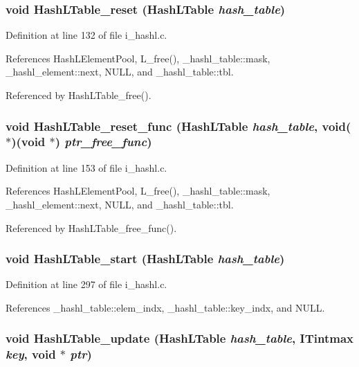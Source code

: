 \subsubsection{\setlength{\rightskip}{0pt plus 5cm}void Hash\-LTable\_\-reset (\bf{Hash\-LTable} {\em hash\_\-table})}\label{i__hashl_8h_aaa44d3f5471ec352c95a534f5a46ebc}




Definition at line 132 of file i\_\-hashl.c.

References Hash\-LElement\-Pool, L\_\-free(), \_\-hashl\_\-table::mask, \_\-hashl\_\-element::next, NULL, and \_\-hashl\_\-table::tbl.

Referenced by Hash\-LTable\_\-free().
\subsubsection{\setlength{\rightskip}{0pt plus 5cm}void Hash\-LTable\_\-reset\_\-func (\bf{Hash\-LTable} {\em hash\_\-table}, void($\ast$)(void $\ast$) {\em ptr\_\-free\_\-func})}\label{i__hashl_8h_7be7973671be7e3ae2e03faaca4fad72}




Definition at line 153 of file i\_\-hashl.c.

References Hash\-LElement\-Pool, L\_\-free(), \_\-hashl\_\-table::mask, \_\-hashl\_\-element::next, NULL, and \_\-hashl\_\-table::tbl.

Referenced by Hash\-LTable\_\-free\_\-func().
\subsubsection{\setlength{\rightskip}{0pt plus 5cm}void Hash\-LTable\_\-start (\bf{Hash\-LTable} {\em hash\_\-table})}\label{i__hashl_8h_5315f1b571d35c6c9a785026de68f323}




Definition at line 297 of file i\_\-hashl.c.

References \_\-hashl\_\-table::elem\_\-indx, \_\-hashl\_\-table::key\_\-indx, and NULL.
\subsubsection{\setlength{\rightskip}{0pt plus 5cm}void Hash\-LTable\_\-update (\bf{Hash\-LTable} {\em hash\_\-table}, \bf{ITintmax} {\em key}, void $\ast$ {\em ptr})}\label{i__hashl_8h_adb190156103a5ed13ca98235c657385}




